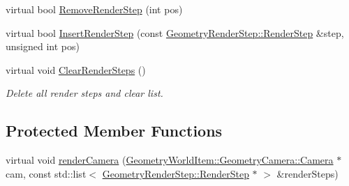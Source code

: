\begin{DoxyCompactItemize}
\item 
virtual bool \mbox{\hyperlink{class_geometry_engine_1_1_geometry_scene_1_1_geometry_scene_a862a151509389f4f0c15e7ed4e3917c8}{Remove\+Render\+Step}} (int pos)
\item 
virtual bool \mbox{\hyperlink{class_geometry_engine_1_1_geometry_scene_1_1_geometry_scene_aed4a5446836e0430fb1a295f760062f6}{Insert\+Render\+Step}} (const \mbox{\hyperlink{class_geometry_engine_1_1_geometry_render_step_1_1_render_step}{Geometry\+Render\+Step\+::\+Render\+Step}} \&step, unsigned int pos)
\item 
\mbox{\label{class_geometry_engine_1_1_geometry_scene_1_1_geometry_scene_a9172c8c10b2e7acc8e6b43dce0c8f238}} 
virtual void \mbox{\hyperlink{class_geometry_engine_1_1_geometry_scene_1_1_geometry_scene_a9172c8c10b2e7acc8e6b43dce0c8f238}{Clear\+Render\+Steps}} ()
\begin{DoxyCompactList}\small\item\em Delete all render steps and clear list. \end{DoxyCompactList}\end{DoxyCompactItemize}
\subsection*{Protected Member Functions}
\begin{DoxyCompactItemize}
\item 
virtual void \mbox{\hyperlink{class_geometry_engine_1_1_geometry_scene_1_1_geometry_scene_aef0be95a28a24292c03bf1138e246439}{render\+Camera}} (\mbox{\hyperlink{class_geometry_engine_1_1_geometry_world_item_1_1_geometry_camera_1_1_camera}{Geometry\+World\+Item\+::\+Geometry\+Camera\+::\+Camera}} $\ast$cam, const std\+::list$<$ \mbox{\hyperlink{class_geometry_engine_1_1_geometry_render_step_1_1_render_step}{Geometry\+Render\+Step\+::\+Render\+Step}} $\ast$ $>$ \&render\+Steps)
\end{DoxyCompactItemize}
